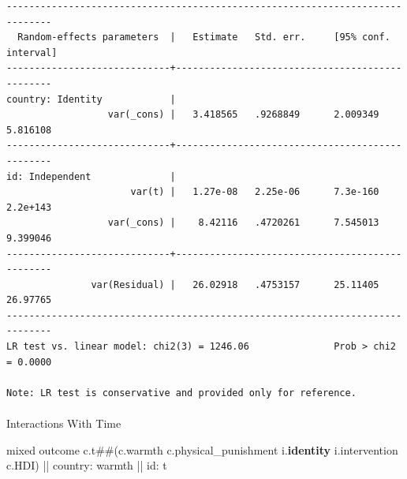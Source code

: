 \documentclass[
  letterpaper,
  DIV=11,
  numbers=noendperiod]{scrreprt}
\makeatletter
\let\oldparagraph\paragraph
\renewcommand{\paragraph}{
    \@ifstar
      \xxxParagraphStar
      \xxxParagraphNoStar
  }
\newcommand{\xxxParagraphStar}[1]{\oldparagraph*{#1}\mbox{}}
\newcommand{\xxxParagraphNoStar}[1]{\oldparagraph{#1}\mbox{}}
\newenvironment{Shaded}{\begin{snugshade}}{\end{snugshade}}
\newcommand{\KeywordTok}[1]{\textcolor[rgb]{0.00,0.23,0.31}{\textbf{#1}}}
\newcommand{\NormalTok}[1]{\textcolor[rgb]{0.00,0.23,0.31}{#1}}
\makeatother
\begin{document}
\begin{verbatim}
------------------------------------------------------------------------------
  Random-effects parameters  |   Estimate   Std. err.     [95% conf. interval]
-----------------------------+------------------------------------------------
country: Identity            |
                  var(_cons) |   3.418565   .9268849      2.009349    5.816108
-----------------------------+------------------------------------------------
id: Independent              |
                      var(t) |   1.27e-08   2.25e-06      7.3e-160    2.2e+143
                  var(_cons) |    8.42116   .4720261      7.545013    9.399046
-----------------------------+------------------------------------------------
               var(Residual) |   26.02918   .4753157      25.11405    26.97765
------------------------------------------------------------------------------
LR test vs. linear model: chi2(3) = 1246.06               Prob > chi2 = 0.0000

Note: LR test is conservative and provided only for reference.
\end{verbatim}

\paragraph{Interactions With Time}\label{interactions-with-time}

\begin{Shaded}
\begin{Highlighting}[]
\NormalTok{mixed outcome c.t\#\#(c.warmth c.physical\_punishment i.}\KeywordTok{identity}\NormalTok{ i.intervention c.HDI) || country: warmth || id: t}
\end{Highlighting}
\end{Shaded}
\end{document}

